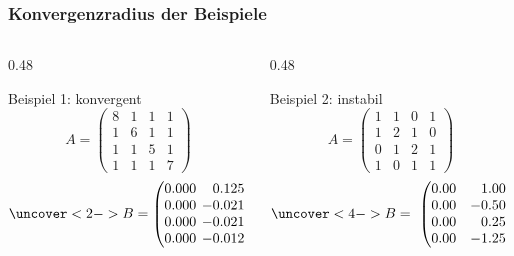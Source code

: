 %
%
%
\begin{frame}
\frametitle{Konvergenzradius der Beispiele}
\vspace{-10pt}

\begin{columns}[t]
\begin{column}{0.48\hsize}
\begin{block}{Beispiel 1: konvergent}
\vspace{-10pt}
\[
A = \begin{pmatrix}
8& 1& 1& 1\\
1& 6& 1& 1\\
1& 1& 5& 1\\
1& 1& 1& 7
\end{pmatrix}
\]
\[
\uncover<2->{
\setlength\arraycolsep{2pt}
B =\begin{pmatrix}
   0.000& \phantom{-}0.125& \phantom{-}0.125& \phantom{-}0.125\\
   0.000&           -0.021& \phantom{-}0.146& \phantom{-}0.146\\
   0.000&           -0.021&           -0.054& \phantom{-}0.146\\
   0.000&           -0.012&           -0.031&           -0.060\\
\end{pmatrix}}
\]
\end{block}
\vspace{-10pt}
\end{column}
\begin{column}{0.48\hsize}
\begin{block}{Beispiel 2: instabil}
\vspace{-10pt}
\[
A = \begin{pmatrix}
1&  1&  0&  1\\
1&  2&  1&  0\\
0&  1&  2&  1\\
1&  0&  1&  1
\end{pmatrix}
\]
\[
\uncover<4->{
B = \begin{pmatrix}
0.00& \phantom{-}1.00& \phantom{-}0.00& \phantom{-}1.00\\
0.00&           -0.50& \phantom{-}0.50&           -0.50\\
0.00& \phantom{-}0.25&           -0.25& \phantom{-}0.70\\
0.00&           -1.25& \phantom{-}0.25&           -1.70
\end{pmatrix}}
\]
\end{block}
\vspace{-10pt}
\end{column}
\end{columns}
\end{frame}
